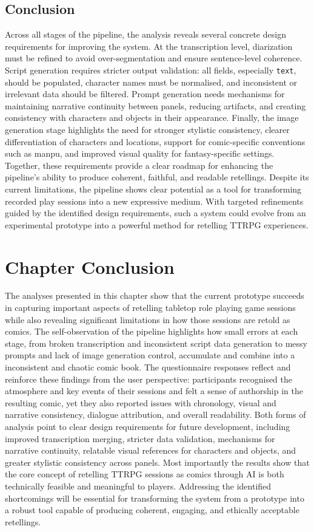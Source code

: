 \subsection*{Conclusion}
Across all stages of the pipeline, the analysis reveals several concrete design requirements for improving the system. At the transcription level, diarization must be refined to avoid over-segmentation and ensure sentence-level coherence. Script generation requires stricter output validation: all fields, especially \texttt{text}, should be populated, character names must be normalised, and inconsistent or irrelevant data should be filtered. Prompt generation needs mechanisms for maintaining narrative continuity between panels, reducing artifacts, and creating consistency with characters and objects in their appearance. Finally, the image generation stage highlights the need for stronger stylistic consistency, clearer differentiation of characters and locations, support for comic-specific conventions such as manpu, and improved visual quality for fantasy-specific settings. Together, these requirements provide a clear roadmap for enhancing the pipeline's ability to produce coherent, faithful, and readable retellings. Despite its current limitations, the pipeline shows clear potential as a tool for transforming recorded play sessions into a new expressive medium. With targeted refinements guided by the identified design requirements, such a system could evolve from an experimental prototype into a powerful method for retelling TTRPG experiences.

\section{Chapter Conclusion}
The analyses presented in this chapter show that the current prototype succeeds in capturing important aspects of retelling tabletop role playing game sessions while also revealing significant limitations in how those sessions are retold as comics. The self-observation of the pipeline highlights how small errors at each stage, from broken transcription and inconsistent script data generation to messy prompts and lack of image generation control, accumulate and combine into a inconsistent and chaotic comic book. The questionnaire responses reflect and reinforce these findings from the user perspective: participants recognised the atmosphere and key events of their sessions and felt a sense of authorship in the resulting comic, yet they also reported issues with chronology, visual and narrative consistency, dialogue attribution, and overall readability. Both forms of analysis point to clear design requirements for future development, including improved transcription merging, stricter data validation, mechanisms for narrative continuity, relatable visual references for characters and objects, and greater stylistic consistency across panels. Most importantly the results show that the core concept of retelling TTRPG sessions as comics through AI is both technically feasible and meaningful to players. Addressing the identified shortcomings will be essential for transforming the system from a prototype into a robust tool capable of producing coherent, engaging, and ethically acceptable retellings.